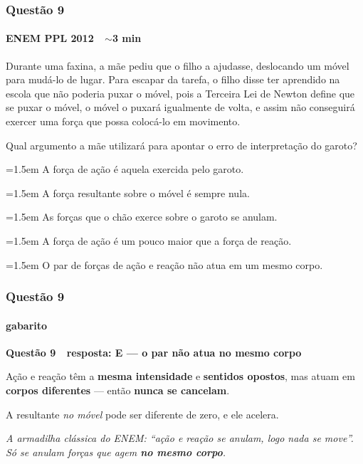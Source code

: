 \documentclass[aspectratio=169,12pt]{beamer}
\newcommand{\optitem}[2]{%
  \par\hangindent=1.5em\hangafter=1
  \makebox[1.5em][l]{\textbf{#1)}}#2}
\newcommand{\alternativas}[5]{%
  \par\vspace{0.55em}%
  \begingroup\setlength{\parskip}{0.30em}%
  \optitem{a}{#1}\optitem{b}{#2}\optitem{c}{#3}\optitem{d}{#4}\optitem{e}{#5}%
  \par\endgroup}
\newcommand{\resposta}[2]{%
  \par\vspace{0.2em}
  {\Large\bfseries\color{vinho}Quest\~ao #1 \,\textemdash\, resposta: #2}
  \par\vspace{0.6em}}
\begin{document}
\begin{frame}
\frametitle{Quest\~ao 9}
\framesubtitle{ENEM PPL 2012 \,\textperiodcentered\, $\sim$3 min}

\small
Durante uma faxina, a m\~ae pediu que o filho a ajudasse, deslocando um
m\'ovel para mud\'a-lo de lugar. Para escapar da tarefa, o filho disse
ter aprendido na escola que n\~ao poderia puxar o m\'ovel, pois a
Terceira Lei de Newton define que se puxar o m\'ovel, o m\'ovel
o puxar\'a igualmente de volta, e assim n\~ao conseguir\'a exercer uma
for\c{c}a que possa coloc\'a-lo em movimento.

\vspace{0.3em}
Qual argumento a m\~ae utilizar\'a para apontar o erro de
interpreta\c{c}\~ao do garoto?

\alternativas{A for\c{c}a de a\c{c}\~ao \'e aquela exercida pelo
garoto.}%
{A for\c{c}a resultante sobre o m\'ovel \'e sempre nula.}%
{As for\c{c}as que o ch\~ao exerce sobre o garoto se anulam.}%
{A for\c{c}a de a\c{c}\~ao \'e um pouco maior que a for\c{c}a de
rea\c{c}\~ao.}%
{O par de for\c{c}as de a\c{c}\~ao e rea\c{c}\~ao n\~ao atua em um
mesmo corpo.}
\end{frame}

\begin{frame}
\frametitle{Quest\~ao 9}
\framesubtitle{gabarito}
\resposta{9}{E --- o par n\~ao atua no mesmo corpo}

A\c{c}\~ao e rea\c{c}\~ao t\^em a \textbf{mesma intensidade} e
\textbf{sentidos opostos}, mas atuam em \textbf{corpos diferentes} ---
ent\~ao \textbf{nunca se cancelam}.

\vspace{0.2em}
A resultante \textit{no m\'ovel} pode ser diferente de zero, e ele
acelera.

\vspace{0.9em}
{\color{grafite}\itshape A armadilha cl\'assica do ENEM: ``a\c{c}\~ao e
rea\c{c}\~ao se anulam, logo nada se move''. S\'o se anulam for\c{c}as
que agem \textbf{no mesmo corpo}.}
\end{frame}
\end{document}
